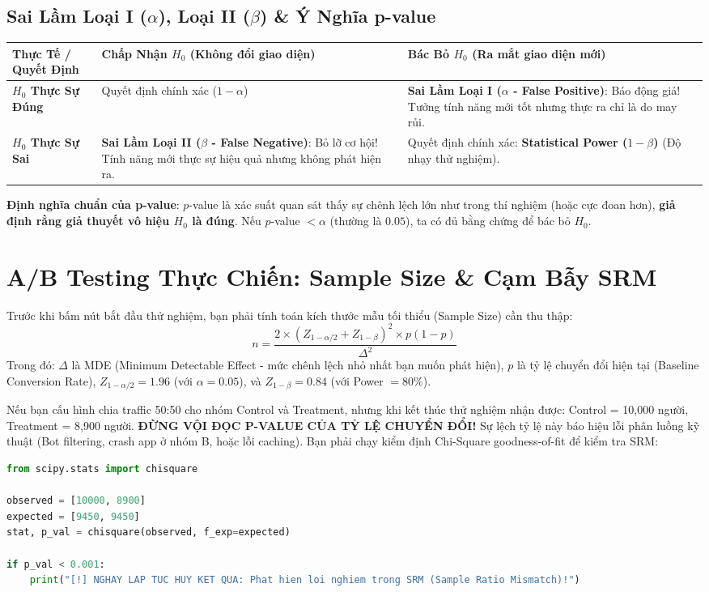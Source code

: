 \subsection{Sai Lầm Loại I ($\alpha$), Loại II ($\beta$) \& Ý Nghĩa p-value}

\begin{center}
\begin{tabular}{|l|p{5cm}|p{5cm}|}
\hline
\textbf{Thực Tế / Quyết Định} & \textbf{Chấp Nhận $H_0$ (Không đổi giao diện)} & \textbf{Bác Bỏ $H_0$ (Ra mắt giao diện mới)} \\
\hline
\textbf{$H_0$ Thực Sự Đúng} & Quyết định chính xác ($1 - \alpha$) & \textbf{Sai Lầm Loại I ($\alpha$ - False Positive)}: Báo động giả! Tưởng tính năng mới tốt nhưng thực ra chỉ là do may rủi. \\
\hline
\textbf{$H_0$ Thực Sự Sai} & \textbf{Sai Lầm Loại II ($\beta$ - False Negative)}: Bỏ lỡ cơ hội! Tính năng mới thực sự hiệu quả nhưng không phát hiện ra. & Quyết định chính xác: \textbf{Statistical Power ($1 - \beta$)} (Độ nhạy thử nghiệm). \\
\hline
\end{tabular}
\end{center}

\textbf{Định nghĩa chuẩn của p-value}: $p$-value là xác suất quan sát thấy sự chênh lệch lớn như trong thí nghiệm (hoặc cực đoan hơn), \textbf{giả định rằng giả thuyết vô hiệu $H_0$ là đúng}. Nếu $p$-value $< \alpha$ (thường là $0.05$), ta có đủ bằng chứng để bác bỏ $H_0$.

\section{A/B Testing Thực Chiến: Sample Size \& Cạm Bẫy SRM}

Trước khi bấm nút bắt đầu thử nghiệm, bạn phải tính toán kích thước mẫu tối thiểu (Sample Size) cần thu thập:
\[
n = \frac{2 \times \left(Z_{1 - \alpha/2} + Z_{1 - \beta}\right)^2 \times p(1 - p)}{\Delta^2}
\]
Trong đó: $\Delta$ là MDE (Minimum Detectable Effect - mức chênh lệch nhỏ nhất bạn muốn phát hiện), $p$ là tỷ lệ chuyển đổi hiện tại (Baseline Conversion Rate), $Z_{1-\alpha/2} = 1.96$ (với $\alpha = 0.05$), và $Z_{1-\beta} = 0.84$ (với Power $= 80\%$).

\begin{thuchanhbox}
Nếu bạn cấu hình chia traffic 50:50 cho nhóm Control và Treatment, nhưng khi kết thúc thử nghiệm nhận được: Control = 10,000 người, Treatment = 8,900 người.
\textbf{ĐỪNG VỘI ĐỌC P-VALUE CỦA TỶ LỆ CHUYỂN ĐỔI!} 
Sự lệch tỷ lệ này báo hiệu lỗi phân luồng kỹ thuật (Bot filtering, crash app ở nhóm B, hoặc lỗi caching). Bạn phải chạy kiểm định Chi-Square goodness-of-fit để kiểm tra SRM:
\begin{lstlisting}[language=Python]
from scipy.stats import chisquare

observed = [10000, 8900]
expected = [9450, 9450]
stat, p_val = chisquare(observed, f_exp=expected)

if p_val < 0.001:
    print("[!] NGHAY LAP TUC HUY KET QUA: Phat hien loi nghiem trong SRM (Sample Ratio Mismatch)!")
\end{lstlisting}
\end{thuchanhbox}

